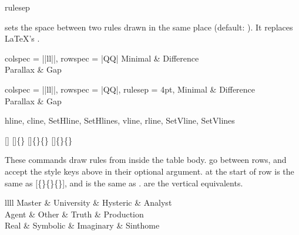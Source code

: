 \begin{codedescribe}[
    key,
    new=2021K
  ]{rulesep}
  \begin{codesyntax}
  \end{codesyntax}
   sets the space between two rules drawn in the same place (default: \val{2pt}). It replaces \LaTeX's .

  \begin{codestore}[st=rules:rulesep]
    \begin{tblr}{colspec = {||ll||}, rowspec = {|QQ|}}
      Minimal  & Difference \\
      Parallax & Gap
    \end{tblr}\quad
    \begin{tblr}{
        colspec = {||ll||}, rowspec = {|QQ|},
        rulesep = 4pt,
      }
      Minimal  & Difference \\
      Parallax & Gap
    \end{tblr}\end{codestore}
  \begin{center}
  \end{center}
\end{codedescribe}

\begin{codedescribe}[
    code,
    new=2021A,
    update=2021D,
    update=2021E,
    update=2021F
  ]{hline, cline, SetHline, SetHlines, vline, rline, SetVline, SetVlines}
  \begin{codesyntax}
    []
    []\{\}
    []\{\}\{\}
    []\{\}\{\}
  \end{codesyntax}
  These commands draw rules from inside the table body.  go between rows, and accept the style keys above in their optional argument.  at the start of row  is the same as [\{\}\{\}\{\}], and  is the same as .  are the vertical equivalents.

  \begin{codestore}[st=rules:commands]
    \begin{tblr}{llll}
      \hline
      Master & University & Hysteric  & Analyst    \\
      \hline[dashed]
      Agent  & Other      & Truth     & Production \\
      Real   & Symbolic   & Imaginary & Sinthome   \\
    \end{tblr}\end{codestore}
  \begin{center}
  \end{center}
\end{codedescribe}

